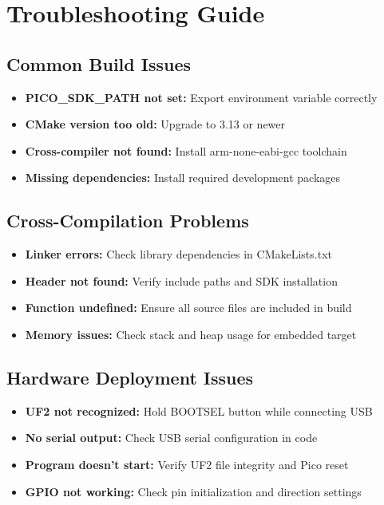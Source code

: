 \documentclass[11pt,a4paper]{article}
\begin{document}
\section{Troubleshooting Guide}

\subsection{Common Build Issues}
\begin{itemize}
    \item \textbf{PICO\_SDK\_PATH not set:} Export environment variable correctly
    \item \textbf{CMake version too old:} Upgrade to 3.13 or newer
    \item \textbf{Cross-compiler not found:} Install arm-none-eabi-gcc toolchain
    \item \textbf{Missing dependencies:} Install required development packages
\end{itemize}

\subsection{Cross-Compilation Problems}
\begin{itemize}
    \item \textbf{Linker errors:} Check library dependencies in CMakeLists.txt
    \item \textbf{Header not found:} Verify include paths and SDK installation
    \item \textbf{Function undefined:} Ensure all source files are included in build
    \item \textbf{Memory issues:} Check stack and heap usage for embedded target
\end{itemize}

\subsection{Hardware Deployment Issues}
\begin{itemize}
    \item \textbf{UF2 not recognized:} Hold BOOTSEL button while connecting USB
    \item \textbf{No serial output:} Check USB serial configuration in code
    \item \textbf{Program doesn't start:} Verify UF2 file integrity and Pico reset
    \item \textbf{GPIO not working:} Check pin initialization and direction settings
\end{itemize}
\end{document}
